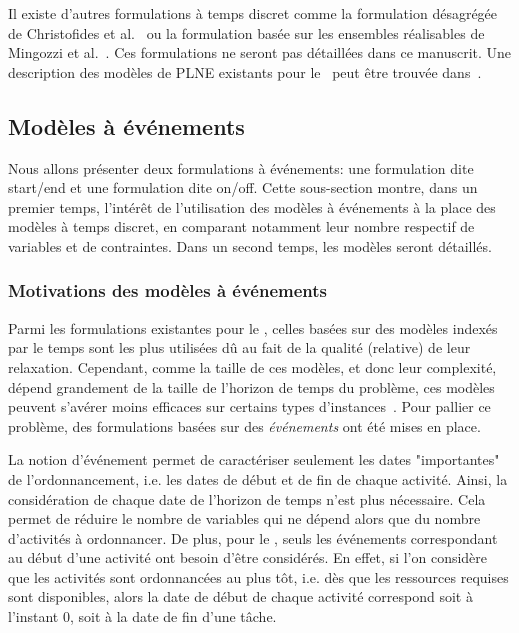 Il existe d'autres formulations à temps discret comme la formulation
désagrégée de Christofides et al.~\cite{CAVT} ou la formulation basée
sur les ensembles réalisables de Mingozzi et al.~\cite{MMRB}. Ces
formulations ne seront pas détaillées dans ce manuscrit. Une
description des modèles de PLNE existants pour le \RCPSP~peut être
trouvée dans~\cite{ADN}.

\subsection{Modèles à événements}
\label{sec:event_RCPSP}

Nous allons présenter deux formulations à événements: une formulation
dite start/end et une formulation dite on/off.  Cette sous-section montre,
dans un premier temps, l'intérêt de l'utilisation des modèles à
événements à la place des modèles à temps discret, en comparant
notamment leur nombre respectif de variables et de contraintes.
Dans un second temps, les modèles seront détaillés.

\subsubsection{Motivations des modèles à événements}
\label{sec:motiv_event_RCPSP}

Parmi les formulations existantes pour le \RCPSP, celles basées sur des
modèles indexés par le temps sont les plus utilisées dû au fait de la
qualité (relative) de leur relaxation.  Cependant, comme la taille de
ces modèles, et donc leur complexité, dépend grandement de la taille
de l'horizon de temps du problème, ces modèles peuvent s’avérer moins
efficaces sur certains types d'instances~\cite{modele_RCPSP}. Pour
pallier ce problème, des formulations basées sur des {\it événements}
ont été mises en place.

La notion d'événement permet de caractériser seulement les dates
"importantes" de l'ordonnancement, i.e. les dates de début et de
fin de chaque activité. Ainsi, la considération de chaque date de
l'horizon de temps n'est plus nécessaire. Cela permet de réduire
le nombre de variables qui ne dépend alors que du nombre
d'activités à ordonnancer. De plus, pour le \RCPSP, seuls les
événements correspondant au début d'une activité ont besoin d'être
considérés. En effet, si l'on considère que les activités sont
ordonnancées au plus tôt, i.e. dès que les ressources requises sont
disponibles, alors la date de début de chaque activité correspond soit
à l'instant $0$, soit à la date de fin d'une tâche.

